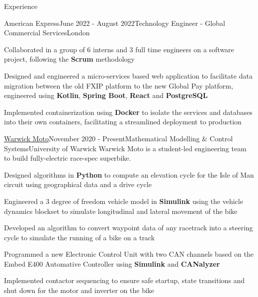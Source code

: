\documentclass{resume}
\begin{document}
    \begin{rSection}{Experience}
        \begin{rSubsection}{American Express}{June 2022 - August 2022}{Technology Engineer - Global Commercial Services}{London}{}
            \item Collaborated in a group of 6 interns and 3 full time engineers on a software project, following the \textbf{Scrum} methodology
            \item Designed and engineered a micro-services based web application to facilitate data migration between the old FXIP platform to the new Global Pay platform, engineered using \textbf{Kotlin}, \textbf{Spring Boot}, \textbf{React} and \textbf{PostgreSQL}
            \item Implemented containerization using \textbf{Docker} to isolate the services and databases into their own containers, facilitating a streamlined deployment to production
        \end{rSubsection}

        \begin{rSubsection}{{\href{https://warwick.ac.uk/fac/sci/wmg/education/undergraduate/student-projects/warwick-moto/}{Warwick Moto}}}{November 2020 - Present}{Mathematical Modelling \& Control Systems}{University of Warwick}
    {Warwick Moto is a student-led engineering team to build fully-electric race-spec superbike.}
            \item Designed algorithms in \textbf{Python} to compute an elevation cycle for the Isle of Man circuit using geographical data and a drive cycle
            \item Engineered a 3 degree of freedom vehicle model in \textbf{Simulink} using the vehicle dynamics blockset to simulate longitudinal and lateral movement of the bike
            \item Developed an algorithm to convert waypoint data of any racetrack into a steering cycle to simulate the running of a bike on a track
            \item Programmed a new Electronic Control Unit with two CAN channels based on the Embed E400 Automative Controller using \textbf{Simulink} and \textbf{CANalyzer}
            \item Implemented contactor sequencing to ensure safe startup, state transitions and shut down for the motor and inverter on the bike       
        \end{rSubsection}


\end{rSection}
\end{document}
